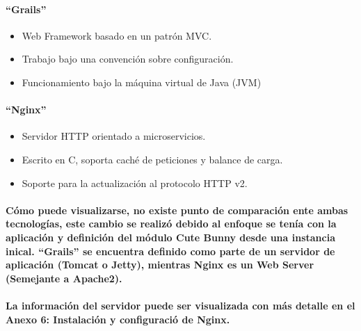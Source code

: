     \paragraph{``Grails''}    
    \begin{itemize}
      \item Web Framework basado en un patrón MVC.
      \item Trabajo bajo una convención sobre configuración.
      \item Funcionamiento bajo la máquina virtual de Java (JVM)
    \end{itemize}
    \paragraph{``Nginx''}    
    \begin{itemize}
      \item Servidor HTTP orientado a microservicios.
      \item Escrito en C, soporta caché de peticiones y balance de carga.
      \item Soporte para la actualización al protocolo HTTP v2.
    \end{itemize}
    \paragraph{Cómo puede visualizarse, no existe punto de comparación ente ambas tecnologías, este cambio se realizó debido al enfoque se tenía con la aplicación y definición del módulo Cute Bunny desde una instancia inical. ``Grails'' se encuentra definido como parte de un servidor de aplicación (Tomcat o Jetty), mientras Nginx es un Web Server (Semejante a Apache2).}
    \paragraph{La información del servidor puede ser visualizada con más detalle en el Anexo 6: Instalación y configuració de Nginx.}  